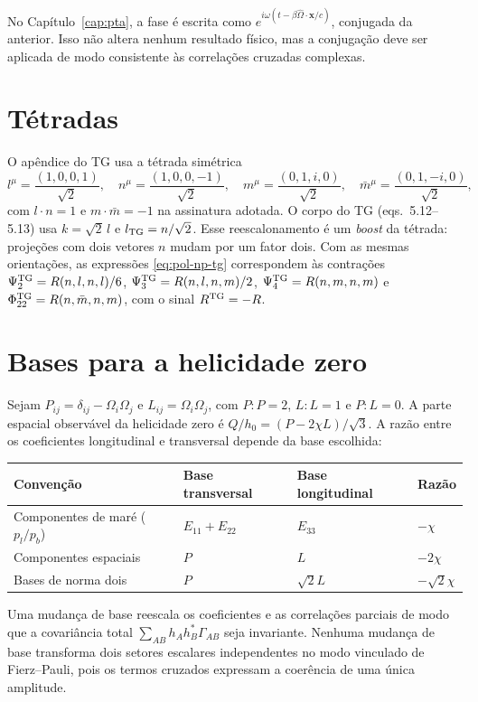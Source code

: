No Capítulo~\ref{cap:pta}, a fase é escrita como
$e^{i\omega(t-\beta\hat\Omega\cdot\mathbf x/c)}$, conjugada da anterior.
Isso não altera nenhum resultado físico, mas a conjugação deve ser
aplicada de modo consistente às correlações cruzadas complexas.

\section{Tétradas}

O apêndice do TG usa a tétrada simétrica
\begin{equation}
 l^\mu=\frac{(1,0,0,1)}{\sqrt2},\quad
 n^\mu=\frac{(1,0,0,-1)}{\sqrt2},\quad
 m^\mu=\frac{(0,1,i,0)}{\sqrt2},\quad
 \bar m^\mu=\frac{(0,1,-i,0)}{\sqrt2},
\end{equation}
com $l\cdot n=1$ e $m\cdot\bar m=-1$ na assinatura adotada. O corpo do
TG (eqs.~5.12--5.13) usa $k=\sqrt2\,l$ e $l_{\rm TG}=n/\sqrt2$. Esse
reescalonamento é um \emph{boost} da tétrada: projeções com dois vetores
$n$ mudam por um fator dois. Com as mesmas orientações, as expressões
\eqref{eq:pol-np-tg} correspondem às contrações
$\Psi_2^{\rm TG}=R(n,l,n,l)/6$, $\Psi_3^{\rm TG}=R(n,l,n,m)/2$,
$\Psi_4^{\rm TG}=R(n,m,n,m)$ e $\Phi_{22}^{\rm TG}=R(n,\bar m,n,m)$,
com o sinal $R^{\rm TG}=-R$.

\section{Bases para a helicidade zero}

Sejam $P_{ij}=\delta_{ij}-\Omega_i\Omega_j$ e $L_{ij}=\Omega_i\Omega_j$,
com $P:P=2$, $L:L=1$ e $P:L=0$. A parte espacial observável da
helicidade zero é $Q/h_0=(P-2\chi L)/\sqrt3$. A razão entre os
coeficientes longitudinal e transversal depende da base escolhida:
\begin{center}
\small
\begin{tabular}{llll}
\toprule
Convenção & Base transversal & Base longitudinal & Razão\\
\midrule
Componentes de maré ($p_l/p_b$) & $E_{11}+E_{22}$ & $E_{33}$ & $-\chi$\\
Componentes espaciais & $P$ & $L$ & $-2\chi$\\
Bases de norma dois & $P$ & $\sqrt2L$ & $-\sqrt2\chi$\\
\bottomrule
\end{tabular}
\end{center}
Uma mudança de base reescala os coeficientes e as correlações parciais
de modo que a covariância total $\sum_{AB}h_Ah_B^*\Gamma_{AB}$ seja
invariante. Nenhuma mudança de base transforma dois setores escalares
independentes no modo vinculado de Fierz--Pauli, pois os termos
cruzados expressam a coerência de uma única amplitude.

